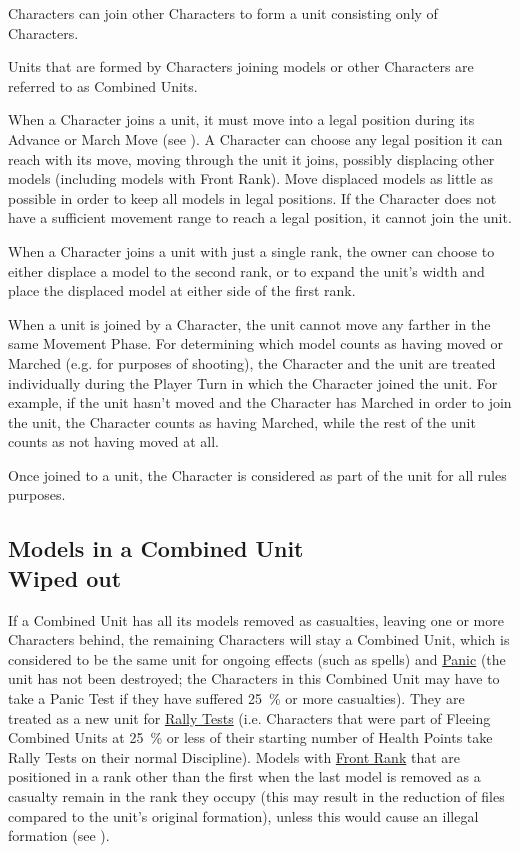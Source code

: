Characters can join other Characters to form a unit consisting only of Characters.

Units that are formed by Characters joining \rnf{} models or other Characters are referred to as Combined Units.

When a Character joins a unit, it must move into a legal position during its Advance or March Move (see ). A Character can choose any legal position it can reach with its move, moving through the unit it joins, possibly displacing other models (including models with Front Rank). Move displaced models as little as possible in order to keep all models in legal positions. If the Character does not have a sufficient movement range to reach a legal position, it cannot join the unit.

When a Character joins a unit with just a single rank, the owner can choose to either displace a model to the second rank, or to expand the unit's width and place the displaced model at either side of the first rank.

When a unit is joined by a Character, the unit cannot move any farther in the same Movement Phase. For determining which model counts as having moved or Marched (e.g. for purposes of shooting), the Character and the unit are treated individually during the Player Turn in which the Character joined the unit. For example, if the unit hasn't moved and the Character has Marched in order to join the unit, the Character counts as having Marched, while the rest of the unit counts as not having moved at all.

Once joined to a unit, the Character is considered as part of the unit for all rules purposes.

\subsection[\rnf{} Models in a Combined Unit Wiped out]{\rnf{} Models in a Combined Unit\\ Wiped out}

If a Combined Unit has all its \rnf{} models removed as casualties, leaving one or more Characters behind, the remaining Characters will stay a Combined Unit, which is considered to be the same unit for ongoing effects (such as \hyperref[one_turn]{\oneturn} spells) and \hyperref[panic_test]{Panic} (the unit has not been destroyed; the Characters in this Combined Unit may have to take a Panic Test if they have suffered \SI{25}{\percent} or more casualties). They are treated as a new unit for \hyperref[rally_fleeing_units]{Rally Tests} (i.e. Characters that were part of Fleeing Combined Units at \SI{25}{\percent} or less of their starting number of Health Points take Rally Tests on their normal Discipline). Models with \hyperref[front_rank]{Front Rank} that are positioned in a rank other than the first when the last \rnf{} model is removed as a casualty remain in the rank they occupy (this may result in the reduction of files compared to the unit's original formation), unless this would cause an illegal formation (see ).

